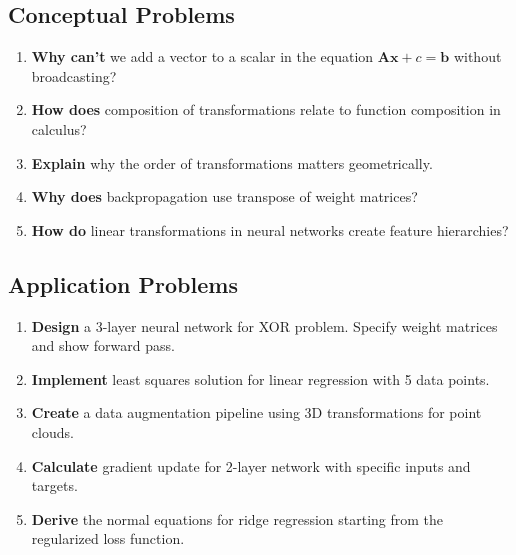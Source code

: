 \documentclass[12pt,a4paper]{article}
\theoremstyle{definition}
\begin{document}
\subsection{Conceptual Problems}

\begin{enumerate}[resume]
\item \textbf{Why can't} we add a vector to a scalar in the equation $\mathbf{Ax} + c = \mathbf{b}$ without broadcasting?

\item \textbf{How does} composition of transformations relate to function composition in calculus?

\item \textbf{Explain} why the order of transformations matters geometrically.

\item \textbf{Why does} backpropagation use transpose of weight matrices?

\item \textbf{How do} linear transformations in neural networks create feature hierarchies?
\end{enumerate}

\subsection{Application Problems}

\begin{enumerate}[resume]
\item \textbf{Design} a 3-layer neural network for XOR problem. Specify weight matrices and show forward pass.

\item \textbf{Implement} least squares solution for linear regression with 5 data points.

\item \textbf{Create} a data augmentation pipeline using 3D transformations for point clouds.

\item \textbf{Calculate} gradient update for 2-layer network with specific inputs and targets.

\item \textbf{Derive} the normal equations for ridge regression starting from the regularized loss function.
\end{enumerate}
\end{document}
